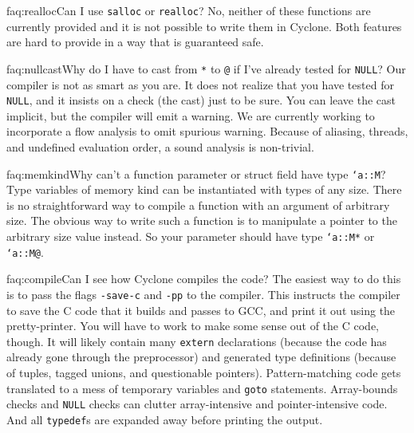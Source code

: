 \begin{faqa}{faq:realloc}{Can I use \texttt{salloc} or \texttt{realloc}?}
No, neither of these functions are currently provided and it is not
possible to write them in Cyclone.  Both features are hard to provide
in a way that is guaranteed safe.
\end{faqa}

\begin{faqa}{faq:nullcast}{Why do I have to cast from \texttt{*} to \texttt{@} if I've already tested for \texttt{NULL}?} 
Our compiler is not as smart as you are.  It does not realize that you
have tested for \texttt{NULL}, and it insists on a check (the cast)
just to be sure.  You can leave the cast implicit, but the compiler
will emit a warning.  We are currently working to incorporate a flow
analysis to omit spurious warning.  Because of aliasing, threads, and 
undefined evaluation order, a sound analysis is non-trivial.
\end{faqa}

\begin{faqa}{faq:memkind}{Why can't a function parameter or struct field have type \texttt{`a::M}?} 
Type variables of memory kind can be instantiated with types of any
size.  There is no straightforward way to compile a function with an
argument of arbitrary size.  The obvious way to write such a function
is to manipulate a pointer to the arbitrary size value instead.  So
your parameter should have type \texttt{`a::M*} or \texttt{`a::M@}.
\end{faqa}

\begin{faqa}{faq:compile}{Can I see how Cyclone compiles the code?}
The easiest way to do this is to pass the flags \texttt{-save-c} and
\texttt{-pp} to the compiler.  This instructs the compiler to save the
C code that it builds and passes to GCC, and print it out using the
pretty-printer.  You will have to work to make some sense out of the C
code, though.  It will likely contain many \texttt{extern}
declarations (because the code has already gone through the
preprocessor) and generated type definitions (because of tuples,
tagged unions, and questionable pointers).  Pattern-matching code gets
translated to a mess of temporary variables and \texttt{goto}
statements.  Array-bounds checks and \texttt{NULL} checks can clutter
array-intensive and pointer-intensive code.  And all \texttt{typedef}s
are expanded away before printing the output.
\end{faqa}

